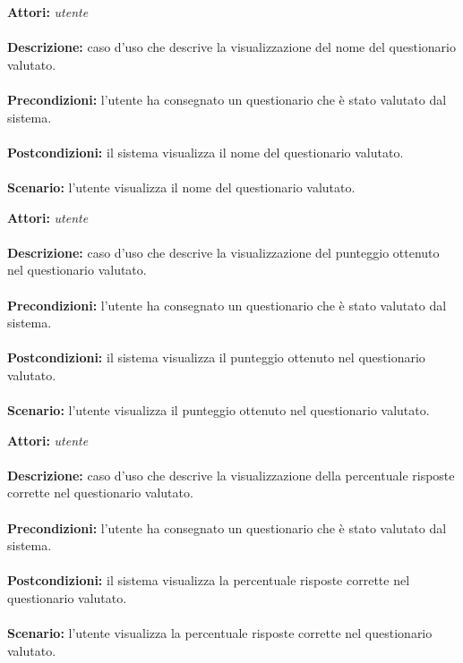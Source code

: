 \documentclass[a4paper,11pt]{article}
\begin{document}

\textbf{Attori:} \textit{utente}
\\ \\
\textbf{Descrizione:} caso d'uso che descrive la visualizzazione del nome del questionario valutato.\\
\\
\textbf{Precondizioni:} l'utente ha consegnato un questionario che è stato valutato dal sistema.\\
\\
\textbf{Postcondizioni:} il sistema visualizza il nome del questionario valutato.\\
\\
\textbf{Scenario:} l’utente visualizza il nome del questionario valutato.\\



\textbf{Attori:} \textit{utente}
\\ \\
\textbf{Descrizione:} caso d'uso che descrive la visualizzazione del punteggio ottenuto nel questionario valutato.\\
\\
\textbf{Precondizioni:} l'utente ha consegnato un questionario che è stato valutato dal sistema.\\
\\
\textbf{Postcondizioni:} il sistema visualizza il punteggio ottenuto nel questionario valutato.\\
\\
\textbf{Scenario:} l’utente visualizza il punteggio ottenuto nel questionario valutato.\\



\textbf{Attori:} \textit{utente}
\\ \\
\textbf{Descrizione:} caso d'uso che descrive la visualizzazione della percentuale risposte corrette nel questionario valutato.\\
\\
\textbf{Precondizioni:} l'utente ha consegnato un questionario che è stato valutato dal sistema.\\
\\
\textbf{Postcondizioni:} il sistema visualizza la percentuale risposte corrette nel questionario valutato.\\
\\
\textbf{Scenario:} l’utente visualizza la percentuale risposte corrette nel questionario valutato.\\
\end{document}
